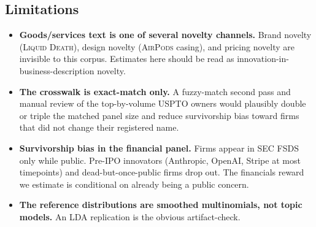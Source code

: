 \documentclass[11pt]{article}
\begin{document}
\begin{landscape}
\begin{table}[p]
\centering
\caption{Selected filings with per-token KL contributions to prospective
and retrospective surprise. \textbf{Surprise is an interaction across
tokens, not a property of any single word.} A filing's KL score is
$\sum_v P(v) \log[P(v)/Q(v)]$, summed across every token $v$ that
appears in the filing's goods/services description. The token
\texttt{software} is by itself common in Class 9, but its
\emph{combination} with rare neighbors --- \texttt{generative
artificial}, \texttt{conversational agents}, \texttt{cryptographic
keys} --- can give a filing high prospective surprise relative to the
look-behind window's mix of tokens. Tokens shown below are the top five
by per-token contribution $P(v) \log[P(v)/Q(v)]$ to each direction's
KL; common tokens like \texttt{software} can appear in the prospective
list when their multinomial weight in the filing is much larger than
their weight in the look-behind reference.}
\label{tab:tokens}
\scriptsize

\end{table}
\end{landscape}

\subsection*{Limitations}
\begin{itemize}
  \item \textbf{Goods/services text is one of several novelty channels.}
        Brand novelty (\textsc{Liquid Death}), design novelty
        (\textsc{AirPods} casing), and pricing novelty are invisible to
        this corpus. Estimates here should be read as
        innovation-in-business-description novelty.
  \item \textbf{The crosswalk is exact-match only.} A fuzzy-match second
        pass and manual review of the top-by-volume USPTO owners would
        plausibly double or triple the matched panel size and reduce
        survivorship bias toward firms that did not change their
        registered name.
  \item \textbf{Survivorship bias in the financial panel.} Firms appear
        in SEC FSDS only while public. Pre-IPO innovators (Anthropic,
        OpenAI, Stripe at most timepoints) and dead-but-once-public
        firms drop out. The financials reward we estimate is conditional
        on already being a public concern.
  \item \textbf{The reference distributions are smoothed multinomials,
        not topic models.} An LDA replication is the obvious
        artifact-check.
\end{itemize}
\end{document}
